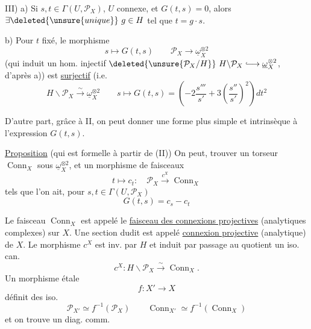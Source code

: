 III) a) Si $s,t\in\Gamma(U,\mathcal P_X)$, $U$ connexe,  et $G(t,s)=0$, alors $\exists\deleted{\unsure{unique}}\ g\in H$ tel que $t=g\cdot s$.

b) Pour $t$ fixé, le morphisme
\[
s\longmapsto G(t,s)\qquad \mathcal P_X\longrightarrow\underline\omega_X^{\otimes2}
\]
(qui induit un hom. injectif $\deleted{\unsure{\mathcal P_X/H}}\ H\backslash\mathcal P_X\lhook\joinrel\longrightarrow\underline\omega_X^{\otimes2}$, d'après a)) est \uline{surjectif} (i.e.
\[
H\backslash\mathcal P_X\xrightarrow{\sim}\underline\omega_X^{\otimes2}\qquad s\longmapsto G(t,s)=\left(-2\frac{s'''}{s'}+3\left(\frac{s''}{s'}\right)^2\right)dt^2
\]

D'autre part, grâce à II, on peut donner une forme plus simple et intrinsèque à l'expression $G(t,s)$.

\uline{Proposition} (qui est formelle à partir de (II)) On peut,  trouver un torseur $\operatorname{Conn}_X$ sous $\underline\omega_X^{\otimes2}$, et un morphisme de faisceaux
\[
t\longmapsto c_t:\quad\mathcal P_X\xrightarrow{c^X}\operatorname{Conn}_X
\]
tels que l'on ait, pour $s,t\in\Gamma(U,\mathcal P_X)$
\[
\boxed{G(t,s)=c_s-c_t}
\]

\margin{!}
Le faisceau $\operatorname{Conn}_X$ est appelé le \uline{faisceau des connexions projectives} (analytiques complexes) sur $X$. Une section dudit est appelé \uline{connexion projective} (analytique) de $X$. Le morphisme $c^X$ est inv. par $H$ et induit par passage au quotient un iso. can.
\[
c^X:H\backslash\mathcal P_X\xrightarrow{\sim}\operatorname{Conn}_X.
\]
Un morphisme étale
\[
f:X'\longrightarrow X
\]
définit des iso.
\[
\mathcal P_{X'}\simeq f^{-1}(\mathcal P_X)\qquad \operatorname{Conn}_{X'}\simeq f^{-1}(\operatorname{Conn}_X)
\]
et on trouve un  diag. comm.
